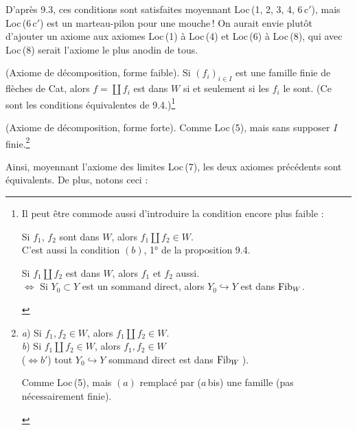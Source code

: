 
D'après 9.3, ces conditions sont satisfaites moyennant Loc\,(1, 2, 3, 4, 6\,c$'$), mais Loc\,(6\,c$'$) est un marteau-pilon pour une mouche\,! On aurait envie plutôt d'ajouter un axiome aux axiomes Loc\,(1) à Loc\,(4) et Loc\,(6) à Loc\,(8), qui avec Loc\,(8) serait l'axiome le plus anodin de tous.

\begin{description}[labelwidth=5.5em,leftmargin=6.5em,style=sameline]
\item[Loc\,(5)] (Axiome de décomposition, forme faible). Si $(f_i)_{i\in I}$ est une famille finie de flèches de Cat, alors $f=\coprod f_i$ est dans $W$ si et seulement si les $f_i$ le sont. (Ce sont les conditions équivalentes de 9.4.)\footnote[48]{Il peut être commode aussi d'introduire la condition encore plus faible :
\begin{description}[nosep,labelwidth=4.5em,leftmargin=5em,style=sameline]
\item[Loc\,(5\,a)] Si $f_1$, $f_2$ sont dans $W$, alors $f_1\amalg f_2\in W$.\\
C'est aussi la condition $(b)$, 1° de la proposition 9.4.
\item[Loc\,(5\,b)] Si $f_1\amalg f_2$ est dans $W$, alors $f_1$ et $f_2$ aussi.\\
$\iff$ Si $Y_0\subset Y$ est un sommand direct, alors $Y_0\hookrightarrow Y$ est dans $\mathrm{Fib}_W$.
\end{description}}

\item[Loc\,(5\,bis)] (Axiome de décomposition, forme forte). Comme Loc\,(5), mais sans supposer $I$ finie.\footnote[49]{
\begin{description}[nosep,labelwidth=4.5em,leftmargin=5em,style=sameline]
\item[Loc\,(5)] \textit{a}) Si $f_1,f_2\in W$, alors $f_1\amalg f_2\in W$.\\
\textit{b}) Si $f_1\amalg f_2\in W$, alors $f_1,f_2\in W$\\
($\iff b'$) tout $Y_0\hookrightarrow Y$ sommand direct est dans $\mathrm{Fib}_W$\,).
\item[Loc\,(5\,bis)] Comme Loc\,(5), mais $(a)$ remplacé par ($a$\,bis) une famille (pas nécessairement finie).
\end{description}}
\end{description}

Ainsi, moyennant l'axiome des limites Loc\,(7), les deux axiomes précédents sont équivalents. De plus, notons ceci :

